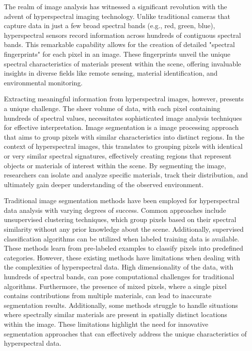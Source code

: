 The realm of image analysis has witnessed a significant revolution with the advent of hyperspectral imaging technology. Unlike traditional cameras that capture data in just a few broad spectral bands (e.g., red, green, blue), hyperspectral sensors record information across hundreds of contiguous spectral bands. This remarkable capability allows for the creation of detailed "spectral fingerprints" for each pixel in an image. These fingerprints unveil the unique spectral characteristics of materials present within the scene, offering invaluable insights in diverse fields like remote sensing, material identification, and environmental monitoring.

Extracting meaningful information from hyperspectral images, however, presents a unique challenge. The sheer volume of data, with each pixel containing hundreds of spectral values, necessitates sophisticated image analysis techniques for effective interpretation. Image segmentation is a image processing approach that aims to group pixels with similar characteristics into distinct regions. In the context of hyperspectral images, this translates to grouping pixels with identical or very similar spectral signatures, effectively creating regions that represent objects or materials of interest within the scene. By segmenting the image, researchers can isolate and analyze specific materials, track their distribution, and ultimately gain deeper understanding of the observed environment.

Traditional image segmentation methods have been employed for hyperspectral data analysis with varying degrees of success. Common approaches include unsupervised clustering techniques, which group pixels based on their spectral similarity without any prior knowledge about the scene. Additionally, supervised classification algorithms can be utilized when labeled training data is available. These methods learn from pre-labeled examples to classify pixels into predefined categories. However, these existing methods have limitations when dealing with the complexities of hyperspectral data. High dimensionality of the data, with hundreds of spectral bands, can pose computational challenges for traditional algorithms. Furthermore, the presence of mixed pixels, where a single pixel contains contributions from multiple materials, can lead to inaccurate segmentation results. Additionally, some methods struggle to handle situations where spectrally similar materials are present in spatially distinct locations within the image. These limitations highlight the need for innovative segmentation approaches that can effectively address the unique characteristics of hyperspectral data.